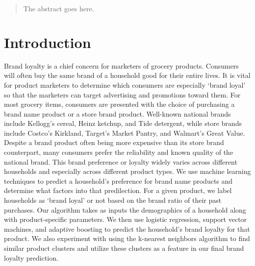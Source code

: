 \documentclass[conference]{IEEEtran}
\begin{document}
\begin{abstract}
The abstract goes here.
\end{abstract}





%
\IEEEpeerreviewmaketitle



\section{Introduction}
Brand loyalty is a chief concern for marketers of grocery products. Consumers will often buy the same brand of a household good for their entire lives. It is vital for product marketers to determine which consumers are especially ‘brand loyal’ so that the marketers can target advertising and promotions toward them. 
For most grocery items, consumers are presented with the choice of purchasing a brand name product or a store brand product. Well-known national brands include Kellogg’s cereal, Heinz ketchup, and Tide detergent, while store brands include Costco’s Kirkland, Target’s Market Pantry, and Walmart’s Great Value. Despite a brand product often being more expensive than its store brand counterpart, many consumers prefer the reliability and known quality of the national brand. This brand preference or loyalty widely varies across different households and especially across different product types. We use machine learning techniques to predict a household’s preference for brand name products and determine what factors into that predilection.
For a given product, we label households as ‘brand loyal’ or not based on the brand ratio of their past purchases. Our algorithm takes as inputs the demographics of a household along with product-specific parameters. We then use logistic regression, support vector machines, and adaptive boosting to predict the household’s brand loyalty for that product. We also experiment with using the k-nearest neighbors algorithm to find similar product clusters and utilize these clusters as a feature in our final brand loyalty prediction.
\end{document}
